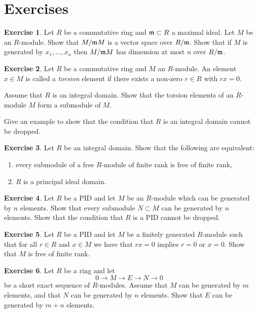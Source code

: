 \documentclass[11pt]{amsbook}
\newcommand{\longto}{\longrightarrow}
\theoremstyle{plain}
\theoremstyle{definition}
\newtheorem{exercise}{Exercise}
\begin{document}
\newpage
\section*{Exercises}

\begin{exercise}Let $R$ be a commutative ring and ${\mathfrak{m}} \subset R$ a maximal ideal. 
Let $M$ be an $R$-module. Show that $M/{\mathfrak{m}} M$ is a vector space over $R/{\mathfrak{m}}$. Show that if $M$ is generated by $x_1,\ldots, x_n$ then $M/{\mathfrak{m}} M$ has dimension at most $n$ over $R/{\mathfrak{m}}$.
\end{exercise}

\begin{exercise}\label{ex:torsion-not-submodule}
Let $R$ be a commutative ring and $M$ an $R$-module. An element $x\in M$ is called a \emph{torsion} element if there exists a non-zero $r\in R$ with $rx=0$. 

Assume that $R$ is an integral domain. Show that the torsion elements of an $R$-module $M$ form a submodule of $M$. 

Give an example to show that the condition that $R$ is an integral domain cannot be dropped.
\end{exercise}

\begin{exercise}\label{exc:non-free-submodule}
Let $R$ be an integral domain. Show that the following are equivalent:
\begin{enumerate}
\item every submodule of a free $R$-module of finite rank is free of finite rank,
\item $R$ is a principal ideal domain.
\end{enumerate}
\end{exercise}


\begin{exercise}
Let $R$ be a PID and let $M$ be an $R$-module which can be generated by $n$ elements. Show that every submodule $N\subset M$ can be generated by $n$ elements. Show that the condition that $R$ is a PID cannot be dropped.
\end{exercise}

\begin{exercise}
Let $R$ be a PID and let $M$ be a finitely generated $R$-module such that for all $r\in R$ and $x\in M$ we have that $rx=0$ implies $r=0$ or $x=0$. Show that $M$ is free of finite rank.
\end{exercise}

\begin{exercise}
Let $R$ be a ring and let 
\[
	0 \longto M {\longto} E {\longto} N \longto 0
\]
be a short exact sequence of $R$-modules. Assume that $M$ can be generated by $m$ elements, and that $N$ can be generated by $n$ elements. Show that $E$ can be generated by $m+n$ elements.
\end{exercise}
\end{document}
